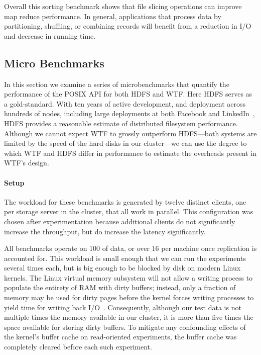 \documentclass[twocolumn,10pt,letterpaper]{article}
\newcommand{\myparagraph}[1]{\vspace{-.25\baselineskip}\paragraph{#1}}
\begin{document}
Overall this sorting benchmark shows that file slicing operations can improve
map reduce performance.  In general, applications that process data by
partitioning, shuffling, or combining records will benefit from a reduction in
I/O and decrease in running time.

\subsection{Micro Benchmarks}

In this section we examine a series of microbenchmarks that quantify the
performance of the POSIX API for both HDFS and WTF.  Here HDFS serves as a
gold-standard.  With ten years of active development, and deployment across
hundreds of nodes, including large deployments at both Facebook and
LinkedIn~\cite{copysets}, HDFS provides a reasonable estimate of distributed
filesystem performance.  Although we cannot expect WTF to grossly outperform
HDFS---both systems are limited by the speed of the hard disks in our
cluster---we can use the degree to which WTF and HDFS differ in performance to
estimate the overheads present in WTF's design.

\myparagraph{Setup} The workload for these benchmarks is generated by twelve
distinct clients, one per storage server in the cluster, that all work in
parallel.  This configuration was chosen after experimentation because
additional clients do not significantly increase the throughput, but do increase
the latency significantly.

All benchmarks operate on \unit{100}{\giga\byte} of data, or over
\unit{16}{\giga\byte} per machine once replication is accounted for.  This
workload is small enough that we can run the experiments several times each, but
is big enough to be blocked by disk on modern Linux kernels.  The Linux virtual
memory subsystem will not allow a writing process to populate the entirety of
RAM with dirty buffers; instead, only a fraction of memory may be used for dirty
pages before the kernel forces writing processes to yield time for writing back
I/O~\cite{linux-vm}.  Consequently, although our test data is not multiple times
the memory available in our cluster, it is more than five times the space
available for storing dirty buffers.  To mitigate any confounding effects of the
kernel's buffer cache on read-oriented experiments, the buffer cache was
completely cleared before each such experiment.
\end{document}
